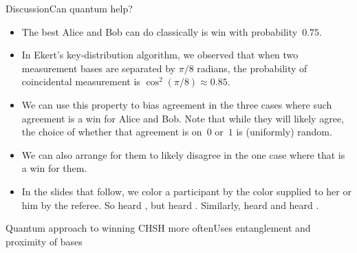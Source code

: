 {\begin{frame}{Discussion}{Can quantum help?}
\begin{itemize}[<+->]
    \item The best Alice and Bob can do classically is win with probability~$0.75$.
    \item In Ekert's key-distribution algorithm, we observed that when two measurement bases are separated by $\pi/8$ radians, the probability of coincidental measurement is $\cos^{2}(\pi/8)\approx 0.85$.
    \item We can use this property to bias agreement in the three cases where such agreement is a win for Alice and Bob.  Note that while they will likely agree, the choice of whether that agreement is on~$0$ or~$1$ is (uniformly) random.
    \item We can also arrange for them to likely disagree in the one case where that is a win for them.
    \item In the slides that follow, we color a participant by the color supplied to her or him by the referee. So  heard , but  heard .  Similarly,  heard  and  heard .
\end{itemize}
    
\end{frame}

\begin{frame}{Quantum approach to winning CHSH more often}{Uses entanglement and proximity of bases}


\end{frame}}

